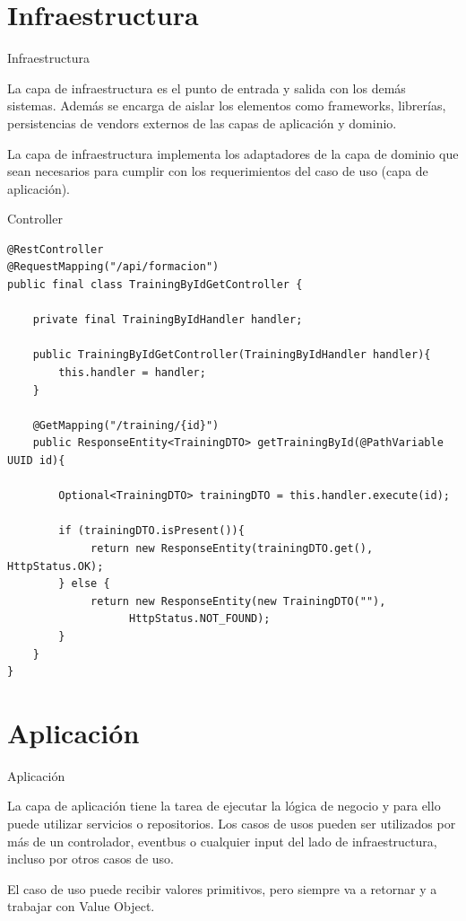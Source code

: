 \documentclass[10pt]{beamer}
\begin{document}
\section{Infraestructura}

\begin{frame}{Infraestructura}

	La capa de infraestructura es el punto de entrada y salida con los demás sistemas. Además se encarga de aislar los elementos como frameworks, librerías, persistencias de vendors externos de las capas de aplicación y dominio.
	
	La capa de infraestructura implementa los adaptadores de la capa de dominio que sean necesarios para cumplir con los requerimientos del caso de uso (capa de aplicación).
		
\end{frame}

\begin{frame}[fragile]{Controller}

\begin{verbatim}
@RestController
@RequestMapping("/api/formacion")
public final class TrainingByIdGetController {

    private final TrainingByIdHandler handler;

    public TrainingByIdGetController(TrainingByIdHandler handler){
        this.handler = handler;
    }

    @GetMapping("/training/{id}")
    public ResponseEntity<TrainingDTO> getTrainingById(@PathVariable UUID id){

        Optional<TrainingDTO> trainingDTO = this.handler.execute(id);

        if (trainingDTO.isPresent()){
             return new ResponseEntity(trainingDTO.get(), HttpStatus.OK);
        } else {
             return new ResponseEntity(new TrainingDTO(""), 
                   HttpStatus.NOT_FOUND);
        }
    }
}

\end{verbatim}


\end{frame}


\section{Aplicación}

\begin{frame}{Aplicación}

La capa de aplicación tiene la tarea de ejecutar la lógica de negocio y para ello puede utilizar servicios o repositorios. Los casos de usos pueden ser utilizados por más de un \alert{controlador}, \alert{eventbus} o cualquier \alert{input} del lado de infraestructura, incluso por otros casos de uso.

El caso de uso puede recibir valores primitivos, pero siempre va a retornar y a trabajar con Value Object.

\end{frame}
\end{document}
